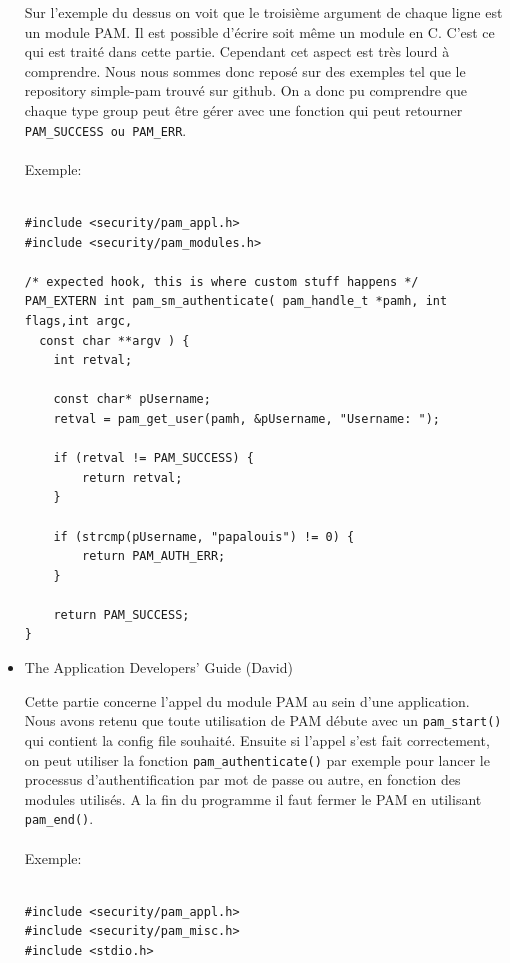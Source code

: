 \documentclass{article}
\begin{document}
\begin{itemize}
    \vspace{0.05cm}

Sur l’exemple du dessus on voit que le troisième argument de chaque ligne est
un module PAM. Il est possible d’écrire soit même un module en C. C’est ce qui
est traité dans cette partie. Cependant cet aspect est très lourd à comprendre.
Nous nous sommes donc reposé sur des exemples tel que le repository simple-pam
trouvé sur github. On a donc pu comprendre que chaque type group peut être
gérer avec une fonction qui peut retourner \texttt{PAM\_SUCCESS ou PAM\_ERR}.
\\ \\
    Exemple:

  \begin{verbatim}

#include <security/pam_appl.h>
#include <security/pam_modules.h>

/* expected hook, this is where custom stuff happens */
PAM_EXTERN int pam_sm_authenticate( pam_handle_t *pamh, int flags,int argc,
  const char **argv ) {
	int retval;

	const char* pUsername;
	retval = pam_get_user(pamh, &pUsername, "Username: ");

	if (retval != PAM_SUCCESS) {
		return retval;
	}

	if (strcmp(pUsername, "papalouis") != 0) {
		return PAM_AUTH_ERR;
	}

	return PAM_SUCCESS;
}
\end{verbatim}

    \item{The Application Developers' Guide (David)}

    \vspace{0.05cm}

  Cette partie concerne l’appel du module PAM au sein d’une application. Nous
  avons retenu que toute utilisation de PAM débute avec un \texttt{pam\_start()}
  qui contient la config file souhaité. Ensuite si l’appel s’est fait
  correctement, on peut utiliser la fonction \texttt{pam\_authenticate()} par
  exemple pour lancer le processus d’authentification par mot de passe ou
  autre, en fonction des modules utilisés. A la fin du programme il faut fermer
  le PAM en utilisant \texttt{pam\_end()}.
\\ \\
    Exemple:

  \begin{verbatim}

#include <security/pam_appl.h>
#include <security/pam_misc.h>
#include <stdio.h>


\end{verbatim}
\end{itemize}
\end{document}

